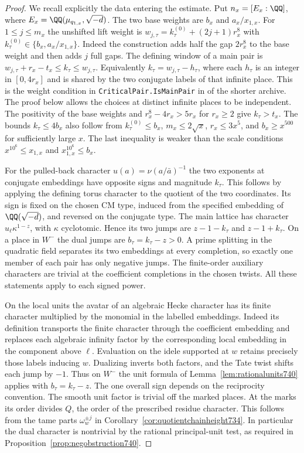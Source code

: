 \documentclass[a4paper,11pt]{article}
\theoremstyle{definition}
\theoremstyle{remark}
\numberwithin{equation}{section}
\begin{document}
\begin{proof}
We recall explicitly the data entering the estimate. Put
\(n_x=[E_x:\QQ]\), where
\(E_x=\QQ(\mu_{q_{1,x}},\sqrt{-d})\). The two base weights
are \(b_x\) and \(a_x/x_{1,x}\). For \(1\le j\le m_x\) the
unshifted lift weight is \(w_{j,\tau}=k^{(0)}_\tau+(2j+1)r_x^8\)
with \(k^{(0)}_\tau\in\{b_x,a_x/x_{1,x}\}\). Indeed the
construction adds half the gap \(2r_x^8\) to the base weight
and then adds \(j\) full gaps. The defining window of a main
pair is \(w_{j,\tau}+r_x-t_x\le k_\tau\le w_{j,\tau}\).
Equivalently \(k_\tau=w_{j,\tau}-h_\tau\), where each \(h_\tau\)
is an integer in \([0,4r_x]\) and is shared by the two conjugate
labels of that infinite place. This is the weight condition in
\texttt{CriticalPair.IsMainPair} in
 of the shorter archive.
The proof below allows the choices at distinct infinite places
to be independent. The positivity of the base weights and
\(r_x^8-4r_x>5r_x\) for \(r_x\ge2\) give \(k_\tau>t_x\). The bounds \(k_\tau\le 4b_x\) also follow from
\(k^{(0)}_\tau\le b_x\), \(m_x\le2\sqrt{x}\),
\(r_x\le3x^5\), and \(b_x\ge x^{500}\) for sufficiently large \(x\).
The last inequality is weaker than the scale conditions
\(x^{10^6}\le x_{1,x}\) and \(x_{1,x}^{10^6}\le b_x\).

For the pulled-back character \(u(a)=\nu(a/\bar a)^{-1}\) the
two exponents at conjugate embeddings have opposite signs and
magnitude \(k_\tau\). This follows by applying the defining
torus character to the quotient of the two coordinates.
Its sign is fixed on the chosen CM type, induced from the
specified embedding of \(\QQ(\sqrt{-d})\), and reversed on the
conjugate type. The main lattice has character
\(u_\ell\kappa^{1-z}\), with \(\kappa\) cyclotomic. Hence its
two jumps are \(z-1-k_\tau\) and \(z-1+k_\tau\). On a place
in \(W^-\) the dual jumps are \(b_\tau=k_\tau-z>0\). A prime
splitting in the quadratic field separates its two embeddings
at every completion, so exactly one member of each pair has
only negative jumps. The finite-order auxiliary characters
are trivial at the coefficient completions in the chosen twists.
All these statements apply to each signed power.

On the local units the avatar of an algebraic Hecke character
has its finite character multiplied by the monomial in the
labelled embeddings. Indeed its definition transports the
finite character through the coefficient embedding and replaces
each algebraic infinity factor by the corresponding local
embedding in the component above \(\ell\). Evaluation on the
idele supported at \(w\) retains precisely those labels inducing
\(w\). Dualizing inverts both factors, and the Tate twist shifts
each jump by \(-1\). Thus on \(W^-\) the unit formula of
Lemma~\ref{lem:rationalunits740} applies with \(b_\tau=k_\tau-z\).
The one overall sign depends on the reciprocity convention.
The smooth unit factor is trivial off the marked places. At the
marks its order divides \(Q\), the order of the prescribed
residue character. This follows from the tame parts
\(\omega_w^{\pm j}\) in Corollary~\ref{cor:quotientchainheight734}.
In particular the dual character is nontrivial by the rational
principal-unit test, as required in Proposition~\ref{prop:negobstruction740}.


\end{proof}
\end{document}
